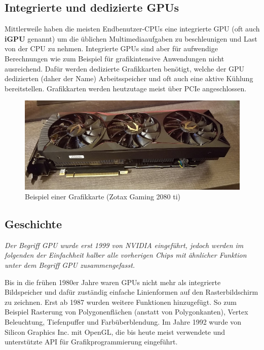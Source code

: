 \documentclass[oneside]{ausarbeitung}
\newcommand*{\quotize}[1]{\glqq #1\grqq}
\begin{document}
\subsection{Integrierte und dedizierte GPUs}
\label{sub:GPU_dedicated_integrated}
Mittlerweile haben die meisten Endbenutzer-\ac{CPU}s eine integrierte \ac{GPU} (oft auch \textbf{iGPU} genannt) um die üblichen Multimediaaufgaben zu beschleunigen und Last von der \ac{CPU} zu nehmen. Integrierte \ac{GPU}s sind aber für aufwendige Berechnungen wie zum Beispiel für grafikintensive Anwendungen nicht ausreichend. Dafür werden dedizierte Grafikkarten benötigt, welche der \ac{GPU} dedizierten (daher der Name) Arbeitsspeicher und oft auch eine aktive Kühlung bereitstellen. Grafikkarten werden heutzutage meist über \ac{PCIe} angeschlossen.

\begin{figure}
    \includegraphics[width=\textwidth]{images/1024px-Zotac_Gaming_GTX_2080_ti.jpg}
    \caption{Beispiel einer Grafikkarte (Zotax Gaming 2080 ti) \cite{2080_ti_graphics_card}}
    \label{fig:2080_ti_graphics_card}
\end{figure}

\subsection{Geschichte \cite[Vgl.][]{gpu_history}}
\label{sub:GPU_history}
\textit{Der Begriff \quotize{\ac{GPU}} wurde erst 1999 von NVIDIA eingeführt, jedoch werden im folgenden der Einfachheit halber alle vorherigen Chips mit ähnlicher Funktion unter dem Begriff \quotize{\ac{GPU}} zusammengefasst.}

Bis in die frühen 1980er Jahre waren \ac{GPU}s nicht mehr als integrierte Bildspeicher und dafür zuständig einfache Linienformen auf den Rasterbildschirm zu zeichnen. Erst ab 1987 wurden weitere Funktionen hinzugefügt. So zum Beispiel Rasterung von Polygonenflächen (anstatt von Polygonkanten), Vertex Beleuchtung, Tiefenpuffer und Farbüberblendung. Im Jahre 1992 wurde von Silicon Graphics Inc. mit OpenGL, die bis heute meist verwendete und unterstützte \ac{API} für Grafikprogrammierung eingeführt.
\end{document}
